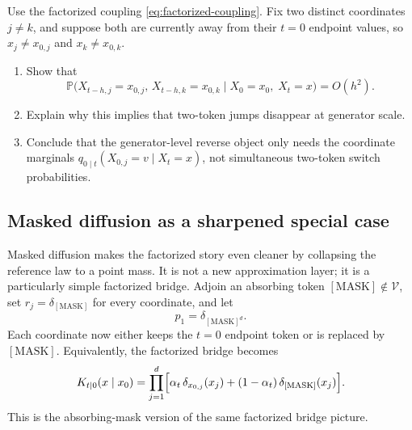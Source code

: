 \documentclass[11pt]{article}
\newif\ifshowsolutions
\newcommand{\SolutionBox}[2][10]{%
  \ifshowsolutions
    \begin{tcolorbox}[stat221panelgray,title={Solution}]
    #2
    \end{tcolorbox}
  \else
    \begin{tcolorbox}[stat221panelgray,unbreakable,title={Workspace}]
    \vspace{#1\baselineskip}
    \end{tcolorbox}
  \fi
}
\begin{document}
\begin{exercise}
\label{ex:one-token-jumps}
Use the factorized coupling \eqref{eq:factorized-coupling}.
Fix two distinct coordinates \(j\neq k\), and suppose both are currently away from their \(t=0\) endpoint values, so \(x_j\neq x_{0,j}\) and \(x_k\neq x_{0,k}\).
\begin{enumerate}[leftmargin=*]
  \item Show that
  \[
    \mathbb{P}\bigl(X_{t-h,j}=x_{0,j},\,X_{t-h,k}=x_{0,k}\mid X_0=x_0,\;X_t=x\bigr)
    =
    O(h^2).
  \]
  \item Explain why this implies that two-token jumps disappear at generator scale.
  \item Conclude that the generator-level reverse object only needs the coordinate marginals \(q_{0\mid t}(X_{0,j}=v\mid X_t=x)\), not simultaneous two-token switch probabilities.
\end{enumerate}
\end{exercise}
\SolutionBox[12]{Conditionally on \(X_0=x_0\) and \(X_t=x\), each coordinate that is away from its \(t=0\) endpoint switches back exactly when its switch time lies in \((t-h,t]\).
For one coordinate this has probability
\[
  \mathbb{P}(\tau_j\in (t-h,t]\mid \tau_j\le t)
  =
  hc_t+o(h).
\]
Because the switch times are independent across coordinates,
\begin{align*}
  &\mathbb{P}\bigl(X_{t-h,j}=x_{0,j},\,X_{t-h,k}=x_{0,k}\mid X_0=x_0,\;X_t=x\bigr) \\
  &\qquad=
  \mathbb{P}(\tau_j\in (t-h,t]\mid \tau_j\le t)\,
  \mathbb{P}(\tau_k\in (t-h,t]\mid \tau_k\le t)
  =
  \bigl(hc_t+o(h)\bigr)^2
  =
  O(h^2).
\end{align*}
After dividing by \(h\) to form the generator, any \(O(h^2)\) event vanishes.
So the first-order reverse dynamics can only move along one-token neighbors.
That is the structural reason the generator depends only on one-coordinate posterior marginals: simultaneous two-token switch probabilities never appear at first order.}

\subsection{Masked diffusion as a sharpened special case}
\label{subsec:masked-diffusion}

Masked diffusion makes the factorized story even cleaner by collapsing the reference law to a point mass.
It is not a new approximation layer; it is a particularly simple factorized bridge.
Adjoin an absorbing token \([\mathrm{MASK}]\notin\mathcal{V}\), set \(r_j=\delta_{[\mathrm{MASK}]}\) for every coordinate, and let
\[
  p_1=\delta_{[\mathrm{MASK}]^d}.
\]
Each coordinate now either keeps the \(t=0\) endpoint token or is replaced by \([\mathrm{MASK}]\).
Equivalently, the factorized bridge becomes
\begin{equation}
  K_{t\mid 0}(x\mid x_0)
  =
  \prod_{j=1}^d
  \Bigl[
    \alpha_t\,\delta_{x_{0,j}}(x_j)
    +
    (1-\alpha_t)\,\delta_{[\mathrm{MASK}]}(x_j)
  \Bigr].
  \label{eq:masked-factorized-bridge}
\end{equation}
This is the absorbing-mask version of the same factorized bridge picture.
\end{document}
